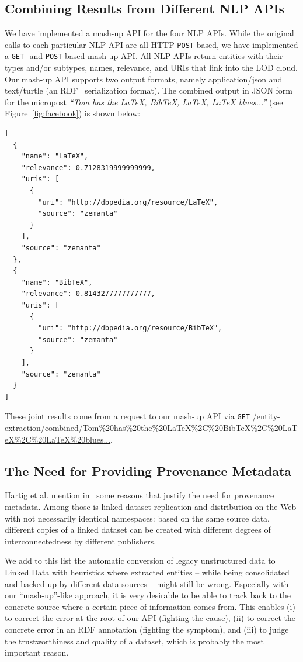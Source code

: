 \documentclass[conference]{IEEEtran}
\begin{document}
\subsection{Combining Results from Different NLP APIs}                     \label{sec:consolidation-nlp}
We have implemented a mash-up API for the four NLP APIs. While the original calls to each particular NLP API are all HTTP \texttt{POST}-based, we have implemented a \texttt{GET}- and \texttt{POST}-based mash-up API. All NLP APIs return entities with their types and/or subtypes, names, relevance, and URIs that link into the LOD cloud. Our mash-up API supports two output formats, namely application/json and text/turtle (an RDF~\cite{RDF} serialization format). The combined output in JSON form for the micropost \emph{``Tom has the LaTeX, BibTeX, LaTeX, LaTeX blues...''} (see Figure~\ref{fig:facebook}) is shown below:
\begin{lstlisting}
[
  {
    "name": "LaTeX",
    "relevance": 0.7128319999999999,
    "uris": [
      {
        "uri": "http://dbpedia.org/resource/LaTeX",
        "source": "zemanta"
      }
    ],
    "source": "zemanta"
  },
  {
    "name": "BibTeX",
    "relevance": 0.8143277777777777,
    "uris": [
      {
        "uri": "http://dbpedia.org/resource/BibTeX",
        "source": "zemanta"
      }
    ],
    "source": "zemanta"
  }  
]
\end{lstlisting}

These joint results come from a request to our mash-up API via \texttt{GET} \url{/entity-extraction/combined/Tom%20has%20the%20LaTeX%2C%20BibTeX%2C%20LaTeX%2C%20LaTeX%20blues...}.

\subsection{The Need for Providing Provenance Metadata}
Hartig et al. mention in~\cite{ipaw10:olaf} some reasons that justify the need for provenance metadata. Among those is linked dataset replication and distribution on the Web with not necessarily identical namespaces: based on the same source data, different copies of a linked dataset can be created with different degrees of interconnectedness by different publishers.

We add to this list the automatic conversion of legacy unstructured data to Linked Data with heuristics where extracted entities -- while being consolidated and backed up by different data sources -- might still be wrong. Especially with our ``mash-up''-like approach, it is very desirable to be able to track back to the concrete source where a certain piece of information comes from. This enables (i) to correct the error at the root of our API (fighting the cause), (ii) to correct the concrete error in an RDF annotation (fighting the symptom), and (iii) to judge the trustworthiness and quality of a dataset, which is probably the most important reason.
\end{document}
